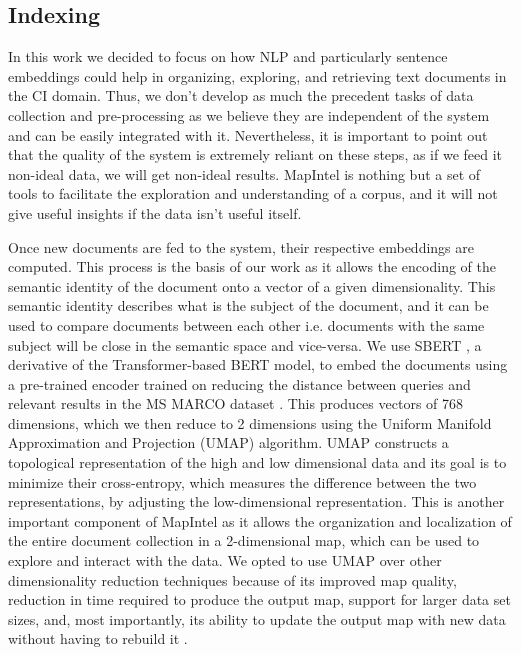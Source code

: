 \documentclass[a4paper]{article}
\begin{document}
\subsection{Indexing} \label{indexing}
In this work we decided to focus on how NLP and particularly sentence embeddings could help in organizing, exploring, and retrieving text documents in the CI domain. Thus, we don't develop as much the precedent tasks of data collection and pre-processing as we believe they are independent of the system and can be easily integrated with it. Nevertheless, it is important to point out that the quality of the system is extremely reliant on these steps, as if we feed it non-ideal data, we will get non-ideal results. MapIntel is nothing but a set of tools to facilitate the exploration and understanding of a corpus, and it will not give useful insights if the data isn't useful itself. 

Once new documents are fed to the system, their respective embeddings are computed. This process is the basis of our work as it allows the encoding of the semantic identity of the document onto a vector of a given dimensionality. This semantic identity describes what is the subject of the document, and it can be used to compare documents between each other i.e. documents with the same subject will be close in the semantic space and vice-versa. We use SBERT \citep{reimers2019}, a derivative of the Transformer-based BERT model, to embed the documents using a pre-trained encoder trained on reducing the distance between queries and relevant results in the MS MARCO dataset \citep{bajaj2018}. This produces vectors of 768 dimensions, which we then reduce to 2 dimensions using the Uniform Manifold Approximation and Projection (UMAP) \citep{mcinnes2020} algorithm. UMAP constructs a topological representation of the high and low dimensional data and its goal is to minimize their cross-entropy, which measures the difference between the two representations, by adjusting the low-dimensional representation. This is another important component of MapIntel as it allows the organization and localization of the entire document collection in a 2-dimensional map, which can be used to explore and interact with the data. We opted to use UMAP over other dimensionality reduction techniques because of its improved map quality, reduction in time required to produce the output map, support for larger data set sizes, and, most importantly, its ability to update the output map with new data without having to rebuild it \citep{mcinnes2020}.
\end{document}
